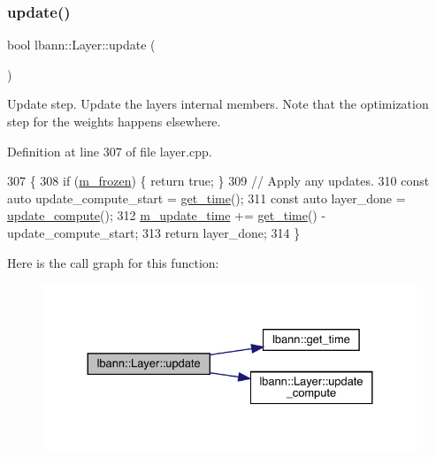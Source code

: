 \subsubsection{\texorpdfstring{update()}{update()}}
{\footnotesize\ttfamily bool lbann\+::\+Layer\+::update (\begin{DoxyParamCaption}{ }\end{DoxyParamCaption})\hspace{0.3cm}{\ttfamily [virtual]}}

Update step. Update the layer\textquotesingle{}s internal members. Note that the optimization step for the weights happens elsewhere. 

Definition at line 307 of file layer.\+cpp.


\begin{DoxyCode}
307                    \{
308   \textcolor{keywordflow}{if} (\hyperlink{classlbann_1_1Layer_afdc60df9731a3ecdeeeb8175fa483676}{m\_frozen}) \{ \textcolor{keywordflow}{return} \textcolor{keyword}{true}; \}
309   \textcolor{comment}{// Apply any updates.}
310   \textcolor{keyword}{const} \textcolor{keyword}{auto} update\_compute\_start = \hyperlink{namespacelbann_a478d36031ff0659893c4322cd856157f}{get\_time}();
311   \textcolor{keyword}{const} \textcolor{keyword}{auto} layer\_done = \hyperlink{classlbann_1_1Layer_a70e08fc96a612f67ade6ba3809536d85}{update\_compute}();
312   \hyperlink{classlbann_1_1Layer_ab7d84533662b02d01ba6685ad6f20935}{m\_update\_time} += \hyperlink{namespacelbann_a478d36031ff0659893c4322cd856157f}{get\_time}() - update\_compute\_start;
313   \textcolor{keywordflow}{return} layer\_done;
314 \}
\end{DoxyCode}
Here is the call graph for this function\+:\nopagebreak
\begin{figure}[H]
\begin{center}
\leavevmode
\includegraphics[width=330pt]{classlbann_1_1Layer_ae4a050e51e3a9bec431cf8b7a5660f2c_cgraph}
\end{center}
\end{figure}

